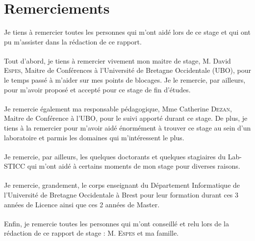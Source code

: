 \section*{Remerciements}
    \paragraph*{} 
    Je tiens à remercier toutes les personnes qui m'ont aidé lors de ce stage et qui ont pu m'assister dans la rédaction de ce rapport.
    
    \paragraph*{}
    Tout d'abord, je tiens à remercier vivement mon maitre de stage, M. David \textsc{Espes}, Maitre de Conférences à l'Université de Bretagne Occidentale (UBO), pour le temps passé à m'aider sur mes points de blocages. Je le remercie, par ailleurs, pour m'avoir proposé et accepté pour ce stage de fin d'études.
    
    \paragraph*{}
    Je remercie également ma responsable pédagogique, Mme Catherine \textsc{Dezan}, Maitre de Conférence à l'UBO, pour le suivi apporté durant ce stage. De plus, je tiens à la remercier pour m'avoir aidé énormément à trouver ce stage au sein d'un laboratoire et parmis les domaines qui m'intéressent le plus.
    
    \paragraph*{}
    Je remercie, par ailleurs, les quelques doctorants et quelques stagiaires du Lab-STICC qui m'ont aidé à certains moments de mon stage pour diverses raisons.
    
    \paragraph*{}
    Je remercie, grandement, le corps enseignant du Département Informatique de l'Université de Bretagne Occidentale à Brest pour leur formation durant ces 3 années de Licence ainsi que ces 2 années de Master.
    
    \paragraph*{}
    Enfin, je remercie toutes les personnes qui m'ont conseillé et relu lors de la rédaction de ce rapport de stage : M. \textsc{Espes} et ma famille.
    
    \newpage